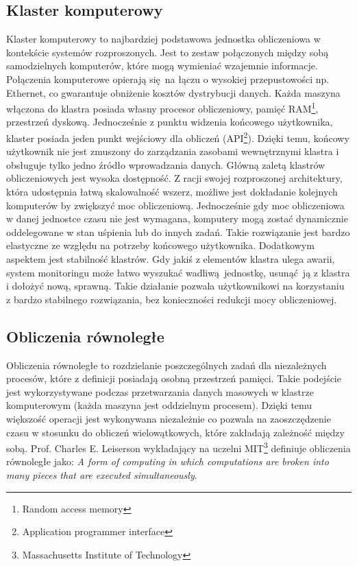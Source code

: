 \subsection{Klaster komputerowy}
Klaster komputerowy to najbardziej podstawowa jednostka obliczeniowa w kontekście systemów rozproszonych. Jest to zestaw połączonych między sobą samodzielnych komputerów, które mogą wymieniać wzajemnie informacje. Połączenia komputerowe opierają się na łączu o wysokiej przepustowości np. Ethernet, co gwarantuje obniżenie kosztów dystrybucji danych. Każda maszyna włączona do klastra posiada własny procesor obliczeniowy, pamięć RAM\footnote{Random access memory}, przestrzeń dyskową. Jednocześnie z punktu widzenia końcowego użytkownika, klaster posiada jeden punkt wejściowy dla obliczeń (API\footnote{Application programmer interface}). Dzięki temu, końcowy użytkownik nie jest zmuszony do zarządzania zasobami wewnętrznymi klastra i obsługuje tylko jedno źródło wprowadzania danych\cite{cluster_grid_cloud}. 
\newline Główną zaletą klastrów obliczeniowych jest wysoka dostępność. Z racji swojej rozproszonej architektury, która udostępnia łatwą skalowalność wszerz, możliwe jest dokładanie kolejnych komputerów by zwiększyć moc obliczeniową. Jednocześnie gdy moc obliczeniowa w danej jednostce czasu nie jest wymagana, komputery mogą zostać dynamicznie oddelegowane w stan uśpienia lub do innych zadań. Takie rozwiązanie jest bardzo elastyczne ze względu na potrzeby końcowego użytkownika. Dodatkowym aspektem jest stabilność klastrów. Gdy jakiś z elementów klastra ulega awarii, system monitoringu może łatwo wyszukać wadliwą jednostkę, usunąć ją z klastra i dołożyć nową, sprawną. Takie działanie pozwala użytkownikowi na korzystaniu z bardzo stabilnego rozwiązania, bez konieczności redukcji mocy obliczeniowej\cite{cluster_grid_cloud_detailed_comparison}.
\subsection{Obliczenia równoległe}
Obliczenia równoległe to rozdzielanie poszczególnych zadań dla niezależnych procesów, które z definicji posiadają osobną przestrzeń pamięci. Takie podejście jest wykorzystywane podczas przetwarzania danych masowych w klastrze komputerowym (każda maszyna jest oddzielnym procesem). Dzięki temu większość operacji jest wykonywana niezależnie co pozwala na zaoszczędzenie czasu w stosunku do obliczeń wielowątkowych, które zakładają zależność między sobą. Prof. Charles E. Leiserson wykładający na uczelni MIT\footnote{Massachusetts Institute of Technology} definiuje obliczenia równoległe jako:
\newline \textit{A form of computing in which computations are broken into many pieces that are executed simultaneously}\cite{mit_presentation}.
